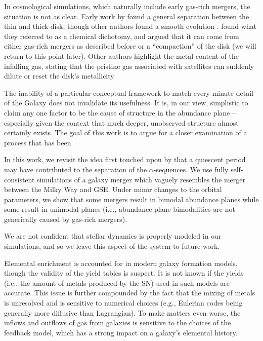 In cosmological simulations, which naturally include early gas-rich mergers, the situation is not as clear. Early work by \citet{2012MNRAS.426..690B} found a general separation between the thin and thick disk, though other authors found a smooth evolution \citep{2013A&A...558A...9M}. \citet{2018MNRAS.474.3629G} found what they referred to as a chemical dichotomy, and argued that it can come from either gas-rich mergers as described before or a ``compaction'' of the disk (we will return to this point later). Other authors highlight the metal content of the infalling gas, stating that the pristine gas associated with satellites can suddenly dilute or reset the disk's metallicity \citep{2020MNRAS.491.5435B,2024MNRAS.528L.122C}

The inability of a particular conceptual framework to match every minute detail of the Galaxy does not invalidate its usefulness. It is, in our view, simplistic to claim any one factor to be the cause of structure in the abundance plane -- especially given the context that much deeper, unobserved structure almost certainly exists. The goal of this work is to argue for a closer examination of a process that has been 

In this work, we revisit the idea first touched upon by \citet{1997ApJ...477..765C} that a quiescent period may have contributed to the separation of the $\alpha$-sequences. We use fully self-consistent simulations of a galaxy merger which vaguely resembles the merger between the Milky Way and GSE. Under minor changes to the orbital parameters, we show that some mergers result in bimodal abundance planes while some result in unimodal planes (i.e., abundance plane bimodalities are not generically caused by gas-rich mergers). 

We are not confident that stellar dynamics is properly modeled in our simulations, and so we leave this aspect of the system to future work.




Elemental enrichment is accounted for in modern galaxy formation models, though the validity of the yield tables is suspect. It is not known if the yields (i.e., the amount of metals produced by the SN) used in such models are accurate. This issue is further compounded by the fact that the mixing of metals is unresolved and is sensitive to numerical choices (e.g., Eulerian codes being generally more diffusive than Lagrangian). To make matters even worse, the inflows and outflows of gas from galaxies is sensitive to the choices of the feedback model, which has a strong impact on a galaxy's elemental history.





